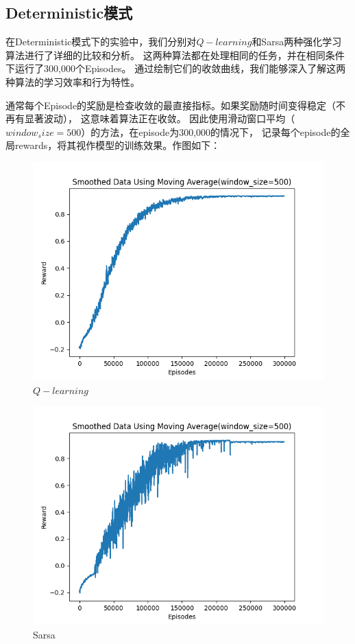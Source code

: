 \documentclass{thuemp}
\begin{document}
\subsection{Deterministic模式}
在Deterministic模式下的实验中，我们分别对$Q-learning$和Sarsa两种强化学习算法进行了详细的比较和分析。
这两种算法都在处理相同的任务，并在相同条件下运行了300,000个Episodes。
通过绘制它们的收敛曲线，我们能够深入了解这两种算法的学习效率和行为特性。

通常每个Episode的奖励是检查收敛的最直接指标。如果奖励随时间变得稳定（不再有显著波动），
这意味着算法正在收敛。
因此使用滑动窗口平均（$window_size=500$）的方法，在episode为300,000的情况下，
记录每个episode的全局rewards，将其视作模型的训练效果。作图如下：

\begin{figure}[H]
  \centering
  \includegraphics[width=1\linewidth]{./img/result/QL-rewards.png}
  \caption{$Q-learning$}
\end{figure}

\begin{figure}[H]
  \centering
  \includegraphics[width=1\linewidth]{./img/result/Sarsa-Rewards.png}
  \caption{Sarsa}
\end{figure}
\end{document}

